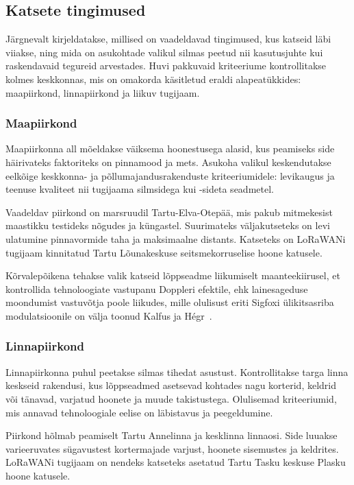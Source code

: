 \documentclass[12pt]{article}
\begin{document}
    \subsection{Katsete tingimused}

    Järgnevalt kirjeldatakse, millised on vaadeldavad tingimused, kus katseid läbi viiakse, ning mida on asukohtade valikul silmas peetud nii kasutusjuhte kui raskendavaid tegureid arvestades.
    Huvi pakkuvaid kriteeriume kontrollitakse kolmes keskkonnas, mis on omakorda käsitletud eraldi alapeatükkides: maapiirkond, linnapiirkond ja liikuv tugijaam.

    \subsubsection{Maapiirkond}

    Maapiirkonna all mõeldakse väiksema hoonestusega alasid, kus peamiseks side häirivateks faktoriteks on pinnamood ja mets.
    Asukoha valikul keskendutakse eelkõige keskkonna- ja põllumajandusrakenduste kriteeriumidele: levikaugus ja teenuse kvaliteet nii tugijaama silmsidega kui -sideta seadmetel.

    Vaadeldav piirkond on marsruudil Tartu-Elva-Otepää, mis pakub mitmekesist maastikku testideks nõgudes ja küngastel.
    Suurimateks väljakutseteks on levi ulatumine pinnavormide taha ja maksimaalne distants.
    Katseteks on LoRaWANi tugijaam kinnitatud Tartu Lõunakeskuse seitsmekorruselise hoone katusele.

    Kõrvalepõikena tehakse valik katseid lõppseadme liikumiselt maanteekiirusel, et kontrollida tehnoloogiate vastupanu Doppleri efektile, ehk lainesageduse moondumist vastuvõtja poole liikudes, mille olulisust eriti Sigfoxi ülikitsasriba modulatsioonile on välja toonud Kalfus ja Hégr~\cite{kalfus2016ultra}.

    \subsubsection{Linnapiirkond}

    Linnapiirkonna puhul peetakse silmas tihedat asustust.
    Kontrollitakse targa linna keskseid rakendusi, kus lõppseadmed asetsevad kohtades nagu korterid, keldrid või tänavad, varjatud hoonete ja muude takistustega.
    Olulisemad kriteeriumid, mis annavad tehnoloogiale eelise on läbistavus ja peegeldumine.

    Piirkond hõlmab peamiselt Tartu Annelinna ja kesklinna linnaosi.
    Side luuakse varieeruvates sügavustest kortermajade varjust, hoonete sisemustes ja keldrites.
    LoRaWANi tugijaam on nendeks katseteks asetatud Tartu Tasku keskuse Plasku hoone katusele.
\end{document}
